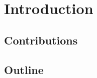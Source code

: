 \chapter{Introduction}
\label{chap:introduction}
\par

\section{Contributions}
\par

\section{Outline}
\par
